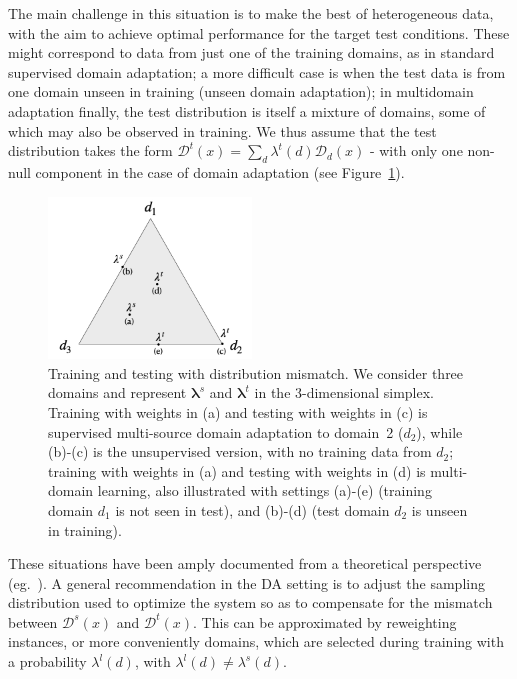 \documentclass[11pt]{article}
\newcommand{\fyDone}[1]{\done[FY]\Todo[FY:]{\textcolor{orange}{#1}}}
\newcommand{\vlambda}{\ensuremath{\boldsymbol\lambda}\xspace} %
\begin{document}
The main challenge in this situation is to make the best of heterogeneous data, with the aim to achieve optimal performance for the target test conditions. These might correspond to data from just one of the training domains, as in standard supervised domain adaptation; a more difficult case is when the test data is from one domain unseen in training (unseen domain adaptation); in multidomain adaptation finally, the test distribution is itself a mixture of domains, some of which may also be observed in training. We thus assume that the test distribution takes the form $\mathcal{D}^{t}(x) = \sum_d \lambda^{t}(d) \mathcal{D}_d(x)$ - with only one non-null  component in the case of domain adaptation (see Figure~\ref{fig:mdmt-lambdas}).
\begin{figure}[h]
  \centering
  \vspace{-\baselineskip}
  \includegraphics[width=0.48\textwidth]{mdmt-lambdas}
  \caption{Training and testing with distribution mismatch. We consider three domains and represent $\vlambda^{s}$ and $\vlambda^{t}$ in the 3-dimensional simplex. Training with weights in (a) and testing with weights in (c) is supervised multi-source domain adaptation to domain~2 ($d_2$), while (b)-(c) is the unsupervised\fyDone{Unseen ?} version, with no training data from $d_2$; training with weights in (a) and testing with weights in (d) is multi-domain learning, also illustrated with settings (a)-(e) (training domain $d_1$ is not seen in test), and (b)-(d)  (test domain $d_2$ is unseen in training).}\label{fig:mdmt-lambdas}
\end{figure}

These situations have been amply documented from a theoretical perspective (eg.\ ). A general recommendation in the DA setting is to adjust the sampling distribution used to optimize the system so as to compensate for the mismatch between $\mathcal{D}^s(x)$ and $\mathcal{D}^t(x)$. This can be approximated by reweighting instances, or more conveniently domains, which are selected during training with a probability $\lambda^{l}(d)$, with $\lambda^{l}(d) \neq \lambda^{s}(d)$.
\end{document}
